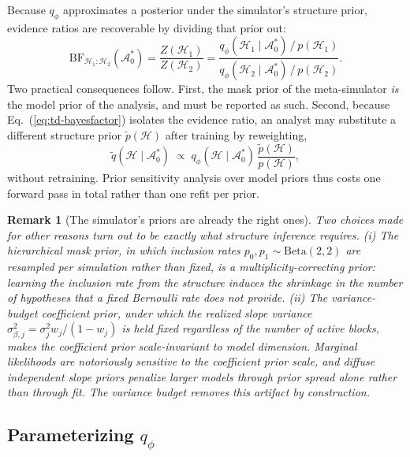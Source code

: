 \documentclass[11pt]{article}
\providecommand{\cref}[1]{Eq.~(\ref{#1})}
\newtheorem{remark}{Remark}
\begin{document}
Because $q_\phi$ approximates a posterior under the simulator's structure prior,
evidence ratios are recoverable by dividing that prior out:
%
\begin{equation}
\label{eq:td-bayesfactor}
\mathrm{BF}_{\mathcal{H}_1 : \mathcal{H}_2}(\mathcal{A}_0^\ast)
= \frac{Z(\mathcal{H}_1)}{Z(\mathcal{H}_2)}
= \frac{q_\phi(\mathcal{H}_1 \mid \mathcal{A}_0^\ast)\,/\,p(\mathcal{H}_1)}
       {q_\phi(\mathcal{H}_2 \mid \mathcal{A}_0^\ast)\,/\,p(\mathcal{H}_2)} .
\end{equation}
%
Two practical consequences follow. First, the mask prior of the meta-simulator
\emph{is} the model prior of the analysis, and must be reported as such. Second,
because \cref{eq:td-bayesfactor} isolates the evidence ratio, an analyst may substitute
a different structure prior $\tilde{p}(\mathcal{H})$ after training by reweighting,
%
\begin{equation}
\label{eq:td-reweight}
\tilde q(\mathcal{H} \mid \mathcal{A}_0^\ast) \;\propto\;
q_\phi(\mathcal{H} \mid \mathcal{A}_0^\ast)\,\frac{\tilde p(\mathcal{H})}{p(\mathcal{H})},
\end{equation}
%
without retraining. Prior sensitivity analysis over model priors thus costs one forward
pass in total rather than one refit per prior.

\begin{remark}[The simulator's priors are already the right ones]
Two choices made for other reasons turn out to be exactly what structure inference
requires. (i) The hierarchical mask prior, in which inclusion rates
$p_0, p_1 \sim \mathrm{Beta}(2,2)$ are resampled per simulation rather than fixed,
is a multiplicity-correcting prior: learning the inclusion rate from the structure
induces the shrinkage in the number of hypotheses that a fixed Bernoulli rate does not
provide. (ii) The variance-budget coefficient prior, under which the realized slope
variance $\sigma^2_{\beta,j} = \sigma_j^2 w_j/(1-w_j)$ is held fixed regardless of the
number of active blocks, makes the coefficient prior scale-invariant to model
dimension. Marginal likelihoods are notoriously sensitive to the coefficient prior
scale, and diffuse independent slope priors penalize larger models through prior spread
alone rather than through fit. The variance budget removes this artifact by
construction.
\end{remark}

\subsection{Parameterizing $q_\phi$}
\end{document}

